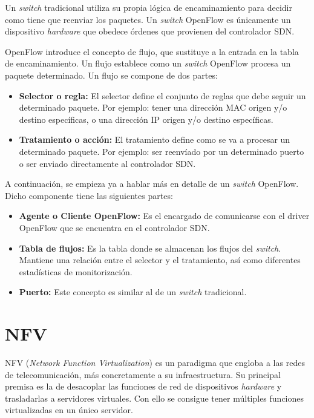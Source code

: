 Un \textit{switch} tradicional utiliza su propia lógica de encaminamiento para decidir como tiene que reenviar los paquetes. Un \textit{switch} OpenFlow es únicamente un dispositivo \textit{hardware} que obedece órdenes que provienen del controlador SDN.

OpenFlow introduce el concepto de flujo, que sustituye a la entrada en la tabla de encaminamiento. Un flujo establece como un \textit{switch} OpenFlow procesa un paquete determinado. Un flujo se compone de dos partes:

\begin{itemize}
	\item \textbf{Selector o regla:} El selector define el conjunto de reglas que debe seguir un determinado paquete. Por ejemplo: tener una dirección MAC origen y/o destino específicas, o una dirección IP origen y/o destino específicas. 
	
	\item \textbf{Tratamiento o acción:} El tratamiento define como se va a procesar un determinado paquete. Por ejemplo: ser reenvíado por un determinado puerto o ser enviado directamente al controlador SDN.
\end{itemize}
	
A continuación, se empieza ya a hablar más en detalle de un \textit{switch} OpenFlow. Dicho componente tiene las siguientes partes:

\begin{itemize}
	\item \textbf{Agente o Cliente OpenFlow:} Es el encargado de comunicarse con el driver OpenFlow que se encuentra en el controlador SDN.
	
	\item \textbf{Tabla de flujos:} Es la tabla donde se almacenan los flujos del \textit{switch}. Mantiene una relación entre el selector y el tratamiento, así como diferentes estadísticas de monitorización.
	
	\item \textbf{Puerto:} Este concepto es similar al de un \textit{switch} tradicional.
\end{itemize}

\section{NFV}
\label{sec:nfv}

NFV (\textit{Network Function Virtualization})\cite{nfvbib} es un paradigma que engloba a las redes de telecomunicación, más concretamente a su infraestructura. Su principal premisa es la de desacoplar las funciones de red de dispositivos \textit{hardware} y
 trasladarlas a servidores virtuales. Con ello se consigue tener múltiples funciones virtualizadas en un único servidor.

